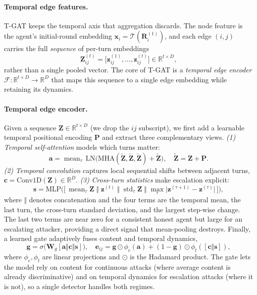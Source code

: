 \paragraph{Temporal edge features.}
T-GAT keeps the temporal axis that aggregation discards. The node feature is the
agent's initial-round embedding $\mathbf{x}_i=\mathcal{T}(\mathbf{R}_i^{(1)})$, and
each edge $(i,j)$ carries the full \emph{sequence} of per-turn embeddings
\begin{equation}
\label{eq:edgeseq}
\mathbf{Z}_{ij}^{(t)}=\big[\mathbf{z}_{ij}^{(1)},\dots,\mathbf{z}_{ij}^{(t)}\big]
\in\mathbb{R}^{t\times D},
\end{equation}
rather than a single pooled vector. The core of T-GAT is a \emph{temporal edge
encoder} $\mathcal{F}:\mathbb{R}^{t\times D}\rightarrow\mathbb{R}^{D}$ that maps
this sequence to a single edge embedding while retaining its dynamics.

\paragraph{Temporal edge encoder.}
Given a sequence $\mathbf{Z}\in\mathbb{R}^{t\times D}$ (we drop the $ij$ subscript),
we first add a learnable temporal positional encoding $\mathbf{P}$ and extract
three complementary views.
\emph{(1) Temporal self-attention} models which turns matter:
\begin{equation}
\mathbf{a}=\operatorname{mean}_\tau\,
\mathrm{LN}\!\big(\mathrm{MHA}(\tilde{\mathbf{Z}},\tilde{\mathbf{Z}},\tilde{\mathbf{Z}})
+\tilde{\mathbf{Z}}\big),\quad \tilde{\mathbf{Z}}=\mathbf{Z}+\mathbf{P}.
\end{equation}
\emph{(2) Temporal convolution} captures local sequential shifts between adjacent
turns, $\mathbf{c}=\mathrm{Conv1D}(\mathbf{Z})\in\mathbb{R}^{D}$.
\emph{(3) Cross-turn statistics} make escalation explicit:
\begin{equation}
\label{eq:stats}
\mathbf{s}=\mathrm{MLP}\big(\big[\,
\operatorname{mean}_\tau\mathbf{Z}\;\Vert\;\mathbf{z}^{(t)}\;\Vert\;
\operatorname{std}_\tau\mathbf{Z}\;\Vert\;
\textstyle\max_\tau\big|\mathbf{z}^{(\tau+1)}-\mathbf{z}^{(\tau)}\big|
\,\big]\big),
\end{equation}
where $\Vert$ denotes concatenation and the four terms are the temporal mean, the
last turn, the cross-turn standard deviation, and the largest step-wise change.
The last two terms are near zero for a consistent honest agent but large for an
escalating attacker, providing a direct signal that mean-pooling destroys. Finally, a learned gate
adaptively fuses content and temporal dynamics,
\begin{equation}
\label{eq:gate}
\mathbf{g}=\sigma\!\big(\mathbf{W}_g[\mathbf{a}\Vert\mathbf{c}\Vert\mathbf{s}]\big),
\quad
\mathbf{e}_{ij}=\mathbf{g}\odot\phi_c(\mathbf{a})
+(1-\mathbf{g})\odot\phi_t([\mathbf{c}\Vert\mathbf{s}]),
\end{equation}
where $\phi_c,\phi_t$ are linear projections and $\odot$ is the Hadamard product.
The gate lets the model rely on content for continuous attacks (where average
content is already discriminative) and on temporal dynamics for escalation
attacks (where it is not), so a single detector handles both regimes.

